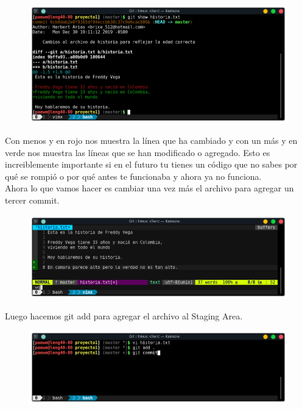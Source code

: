 \documentclass{article}
\begin{document}
\begin{figure}[h!]
  \centering
  \includegraphics[scale=0.75]{./Pictures/085_git_show.png}
\end{figure}

Con menos y en rojo nos muestra la línea que ha cambiado y con un más y en
verde nos muestra las líneas que se han modificado o agregado. Esto es
increiblemente importante si en el futuro tu tienes un código que no sabes por
qué se rompió o por qué antes te funcionaba y ahora ya no funciona.\\

Ahora lo que vamos hacer es cambiar una vez más el archivo para agregar un
tercer commit.

\begin{figure}[h!]
  \centering
  \includegraphics[scale=0.75]{./Pictures/086_vim_edit.png}
\end{figure}

Luego hacemos git add para agregar el archivo al Staging Area.

\newpage

\begin{figure}[h!]
  \centering
  \includegraphics[scale=0.75]{./Pictures/087_git_add_commit.png}
\end{figure}
\end{document}
